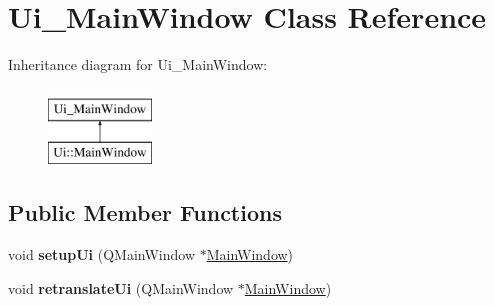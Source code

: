 \hypertarget{class_ui___main_window}{}\section{Ui\+\_\+\+Main\+Window Class Reference}
\label{class_ui___main_window}
Inheritance diagram for Ui\+\_\+\+Main\+Window\+:\begin{figure}[H]
\begin{center}
\leavevmode
\includegraphics[height=2.000000cm]{class_ui___main_window}
\end{center}
\end{figure}
\subsection*{Public Member Functions}
\begin{DoxyCompactItemize}
\item 
\mbox{\label{class_ui___main_window_acf4a0872c4c77d8f43a2ec66ed849b58}} 
void {\bfseries setup\+Ui} (Q\+Main\+Window $\ast$\mbox{\hyperlink{class_main_window}{Main\+Window}})
\item 
\mbox{\label{class_ui___main_window_a097dd160c3534a204904cb374412c618}} 
void {\bfseries retranslate\+Ui} (Q\+Main\+Window $\ast$\mbox{\hyperlink{class_main_window}{Main\+Window}})
\end{DoxyCompactItemize}

